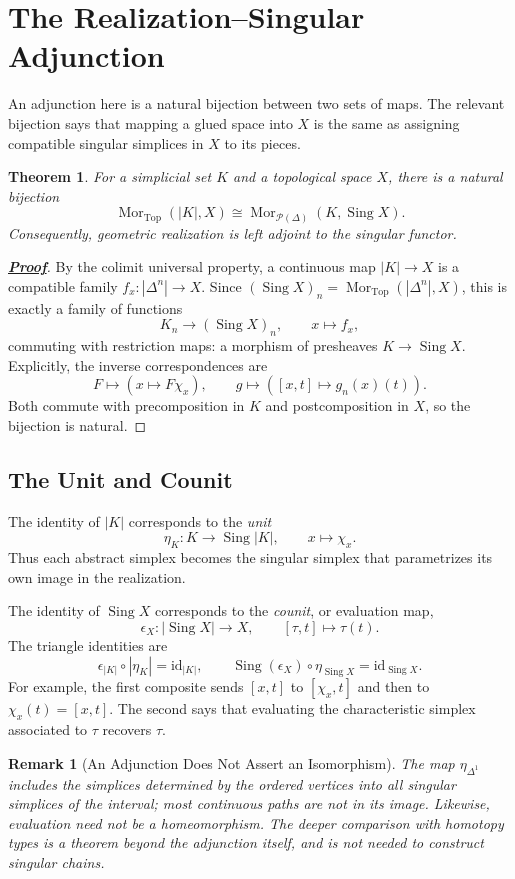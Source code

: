 \documentclass[11pt]{article}
\newcommand{\proofdest}{}
\newcommand{\claim}[1]{\def\proofdest{proof:#1}\hypertarget{statement:#1}{}}
\theoremstyle{linked}
\newtheorem{theorem}[proposition]{Theorem}
\theoremstyle{plainlecture}
\newtheorem{remark}[proposition]{Remark}
\newenvironment{linkedproof}[1]{\hypertarget{proof:#1}{}\begin{proof}[\normalfont\bfseries\hyperlink{statement:#1}{Proof}]}{\end{proof}}
\newcommand{\Mor}{\operatorname{Mor}}
\newcommand{\PSh}{\mathcal{P}}
\newcommand{\Sing}{\operatorname{Sing}}
\newcommand{\id}{\mathrm{id}}
\newcommand{\Top}{\mathrm{Top}}
\begin{document}
\section{The Realization--Singular Adjunction}\label{sec:adjunction}
An adjunction here is a natural bijection between two sets of maps. The relevant bijection says that mapping a glued space into $X$ is the same as assigning compatible singular simplices in $X$ to its pieces.

\claim{adjunction}
\begin{theorem}
For a simplicial set $K$ and a topological space $X$, there is a natural bijection
\[
\Mor_\Top(|K|,X)\cong\Mor_{\PSh(\Delta)}(K,\Sing X).
\]
Consequently, geometric realization is left adjoint to the singular functor.
\end{theorem}
\begin{linkedproof}{adjunction}
By the colimit universal property, a continuous map $|K|\to X$ is a compatible family $f_x:|\Delta^n|\to X$. Since $(\Sing X)_n=\Mor_\Top(|\Delta^n|,X)$, this is exactly a family of functions
\[
K_n\longrightarrow(\Sing X)_n,\qquad x\longmapsto f_x,
\]
commuting with restriction maps: a morphism of presheaves $K\to\Sing X$. Explicitly, the inverse correspondences are
\[
F\longmapsto(x\mapsto F\chi_x),\qquad
 g\longmapsto([x,t]\mapsto g_n(x)(t)).
\]
Both commute with precomposition in $K$ and postcomposition in $X$, so the bijection is natural.
\end{linkedproof}

\subsection{The Unit and Counit}
The identity of $|K|$ corresponds to the \emph{unit}
\[
\eta_K:K\longrightarrow\Sing|K|,\qquad
x\longmapsto\chi_x.
\]
Thus each abstract simplex becomes the singular simplex that parametrizes its own image in the realization.

The identity of $\Sing X$ corresponds to the \emph{counit}, or evaluation map,
\[
\epsilon_X:|\Sing X|\longrightarrow X,\qquad
[\tau,t]\longmapsto\tau(t).
\]
The triangle identities are
\[
\epsilon_{|K|}\circ|\eta_K|=\id_{|K|},\qquad
\Sing(\epsilon_X)\circ\eta_{\Sing X}=\id_{\Sing X}.
\]
For example, the first composite sends $[x,t]$ to $[\chi_x,t]$ and then to $\chi_x(t)=[x,t]$. The second says that evaluating the characteristic simplex associated to $\tau$ recovers $\tau$.

\begin{remark}[An Adjunction Does Not Assert an Isomorphism]
The map $\eta_{\Delta^{1}}$ includes the simplices determined by the ordered vertices into all singular simplices of the interval; most continuous paths are not in its image. Likewise, evaluation need not be a homeomorphism. The deeper comparison with homotopy types is a theorem beyond the adjunction itself, and is not needed to construct singular chains.
\end{remark}
\end{document}
